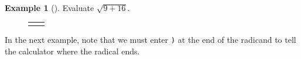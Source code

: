 \documentclass[10pt,]{book}
\theoremstyle{plain}
\theoremstyle{definition}
\theoremstyle{definition}
\newtheorem{example}[theorem]{Example}
\theoremstyle{definition}
\numberwithin{equation}{part}
\newlength{\panelmax}
\begin{document}
\begin{example}[]\label{example-104}
Evaluate \(\sqrt{9+16} \).%
{%
\setlength{\panelmax}{0pt}
\newsavebox{\panelboxAIWp}
\newlength{\phAIWp}\setlength{\phAIWp}{\ht\panelboxAIWp+\dp\panelboxAIWp}
\settototalheight{\phAIWp}{\usebox{\panelboxAIWp}}
\setlength{\panelmax}{\maxof{\panelmax}{\phAIWp}}
\newsavebox{\panelboxAIXp}
\newlength{\phAIXp}\setlength{\phAIXp}{\ht\panelboxAIXp+\dp\panelboxAIXp}
\settototalheight{\phAIXp}{\usebox{\panelboxAIXp}}
\setlength{\panelmax}{\maxof{\panelmax}{\phAIXp}}
\leavevmode%
\setlength{\tabcolsep}{0.025\textwidth}
\begin{figure}
\begin{tabular}{@{}*{2}{c}@{}}
\begin{minipage}[c][\panelmax][t]{0.6\textwidth}\usebox{\panelboxAIWp}\end{minipage}&
\begin{minipage}[c][\panelmax][t]{0.35\textwidth}\usebox{\panelboxAIXp}\end{minipage}\end{tabular}
\end{figure}
}%
\end{example}
\par
In the next example, note that we must enter \lstinline?)? at the end of the radicand to tell the calculator where the radical ends.%
\end{document}
